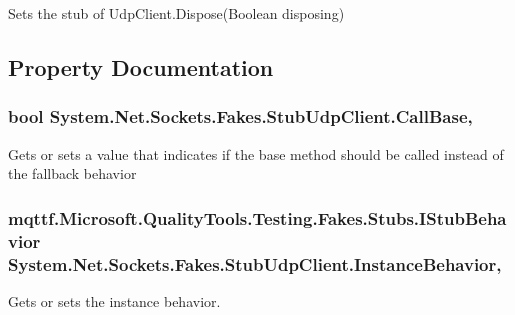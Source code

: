 Sets the stub of Udp\-Client.\-Dispose(\-Boolean disposing)



\subsection{Property Documentation}
\hypertarget{class_system_1_1_net_1_1_sockets_1_1_fakes_1_1_stub_udp_client_a10d2bae49ea624902827781087ab4d8e}{
\subsubsection[{Call\-Base}]{\setlength{\rightskip}{0pt plus 5cm}bool System.\-Net.\-Sockets.\-Fakes.\-Stub\-Udp\-Client.\-Call\-Base\hspace{0.3cm}{\ttfamily [get]}, {\ttfamily [set]}}}\label{class_system_1_1_net_1_1_sockets_1_1_fakes_1_1_stub_udp_client_a10d2bae49ea624902827781087ab4d8e}


Gets or sets a value that indicates if the base method should be called instead of the fallback behavior

\hypertarget{class_system_1_1_net_1_1_sockets_1_1_fakes_1_1_stub_udp_client_af504844dcf49d075ccb56d3890a199d2}{
\subsubsection[{Instance\-Behavior}]{\setlength{\rightskip}{0pt plus 5cm}mqttf.\-Microsoft.\-Quality\-Tools.\-Testing.\-Fakes.\-Stubs.\-I\-Stub\-Behavior System.\-Net.\-Sockets.\-Fakes.\-Stub\-Udp\-Client.\-Instance\-Behavior\hspace{0.3cm}{\ttfamily [get]}, {\ttfamily [set]}}}\label{class_system_1_1_net_1_1_sockets_1_1_fakes_1_1_stub_udp_client_af504844dcf49d075ccb56d3890a199d2}


Gets or sets the instance behavior.

